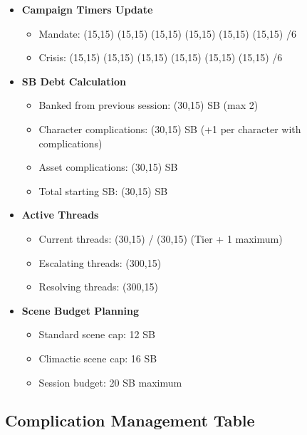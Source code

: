 \documentclass[11pt,letterpaper]{article}
\begin{document}
\begin{itemize}
    \item \textbf{Campaign Timers Update}
    \begin{itemize}
        \item Mandate: \framebox(15,15){} \framebox(15,15){} \framebox(15,15){} \framebox(15,15){} \framebox(15,15){} \framebox(15,15){} /6
        \item Crisis: \framebox(15,15){} \framebox(15,15){} \framebox(15,15){} \framebox(15,15){} \framebox(15,15){} \framebox(15,15){} /6
    \end{itemize}
    
    \item \textbf{SB Debt Calculation}
    \begin{itemize}
        \item Banked from previous session: \framebox(30,15){} SB (max 2)
        \item Character complications: \framebox(30,15){} SB (+1 per character with complications)
        \item Asset complications: \framebox(30,15){} SB
        \item Total starting SB: \framebox(30,15){} SB
    \end{itemize}
    
    \item \textbf{Active Threads}
    \begin{itemize}
        \item Current threads: \framebox(30,15){} / \framebox(30,15){} (Tier + 1 maximum)
        \item Escalating threads: \framebox(300,15){} 
        \item Resolving threads: \framebox(300,15){}
    \end{itemize}
    
    \item \textbf{Scene Budget Planning}
    \begin{itemize}
        \item Standard scene cap: 12 SB
        \item Climactic scene cap: 16 SB
        \item Session budget: 20 SB maximum
    \end{itemize}
\end{itemize}

\subsection{Complication Management Table}
\end{document}
